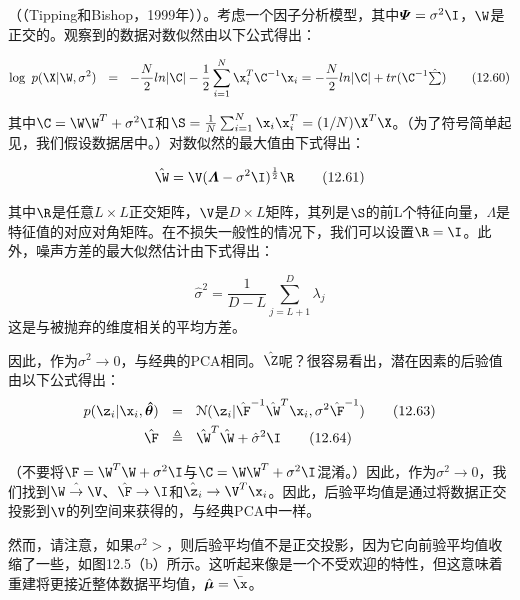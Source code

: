 \documentclass[a4paper]{article}
\begin{document}
\begin{mythm}\label{thm:light}
	（（Tipping和Bishop，1999年））。考虑一个因子分析模型，其中$\boldsymbol{\varPsi}=\sigma^2\I$，$\W$是正交的。观察到的数据对数似然由以下公式得出： 
	
	
	\begin{equation}
	\log \ p(\X|\W,\sigma^2)\ \ =\ \ -\frac{N}{2}ln|\C|-\frac{1}{2}\sum_{i=1}^{N}\x_i^T\C^{-1}\x_i=-\frac{N}{2}ln|\C|+tr(\C^{-1}\textstyle\hat{\sum})\tag{12.60}
	\end{equation}
\end{mythm}

其中$\C=\W\W^T+\sigma^2\I$和$\S=\frac{1}{N}\sum\nolimits_{i=1}^N\x_i\x_i^T=(1/N)\X^T\X$。（为了符号简单起见，我们假设数据居中。）对数似然的最大值由下式得出：

\begin{equation}
	\hat{\W}=\V (\boldsymbol{\varLambda}-\sigma^2\I)^{\frac{1}{2}}\R\tag{12.61}
\end{equation}

其中$\R$是任意$L\times L$正交矩阵，$\V$是$D\times L$矩阵，其列是$\S$的前L个特征向量，$\varLambda$是特征值的对应对角矩阵。在不损失一般性的情况下，我们可以设置$\R=\I$。此外，噪声方差的最大似然估计由下式得出：

\begin{equation}
	\hat{\sigma}^2=\dfrac{1}{D-L}\sum_{j=L+1}^{D}\lambda_j\tag{12.62}
\end{equation}
这是与被抛弃的维度相关的平均方差。

因此，作为$\sigma^2\rightarrow0$，与经典的PCA相同。$\hat{\Z}$呢？很容易看出，潜在因素的后验值由以下公式得出：
\begin{align}
	p(\z_i|\x_i,\boldsymbol{\hat{\theta}})\ \ &=\ \ \mathcal{N}(\z_i|\hat{\F}^{-1}\hat{\W}^T\x_i,\sigma^2\hat{\F}^{-1})\tag{12.63}\\
	\hat{\F}\ \ &\triangleq\ \ \hat{\W}^T\hat{\W}+\hat{\sigma}^2\I\tag{12.64}
\end{align}

（不要将$\F=\W^T\W+\sigma^2\I$与$\C=\W\W^T+\sigma^2\I$混淆。）因此，作为$\sigma^2\rightarrow0$，我们找到$\hat{\W\rightarrow\V}$、$\hat{\F}\rightarrow\I$和$\hat{\z_i}\rightarrow\V^T\x_i$。因此，后验平均值是通过将数据正交投影到$\V$的列空间来获得的，与经典PCA中一样。

然而，请注意，如果$\sigma^2>$，则后验平均值不是正交投影，因为它向前验平均值收缩了一些，如图12.5（b）所示。这听起来像是一个不受欢迎的特性，但这意味着重建将更接近整体数据平均值，$\hat{\boldsymbol{\mu}}= \bar{\x}$。 
\end{document}
